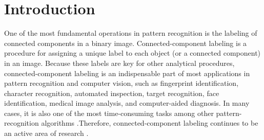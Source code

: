 \section{Introduction}

One of the most fundamental operations in pattern recognition is the labeling of connected components in a binary image. 
Connected-component labeling is a procedure for assigning a unique label to each object (or a connected component) in an 
image. Because these labels are key for other analytical procedures, connected-component labeling is an indispensable part 
of most applications in pattern recognition and computer vision, such as fingerprint identification, character recognition,
automated inspection, target recognition, face identification, medical image analysis, and computer-aided diagnosis. 
In many cases, it is also one of the most time-consuming tasks among other pattern-recognition algorithms 
\cite{Alnuweiri1992_Parallel}.Therefore, connected-component labeling continues to be an active area of research 
\cite{Gonzales_Digital,Agarwal2006_Efficient,Chang2004_Linear,Hayashi2001_Fast,Hu2005_Fast,Knop1998_Parallel,
Moga1997_Parallel,Wang2003_Parallel}.
